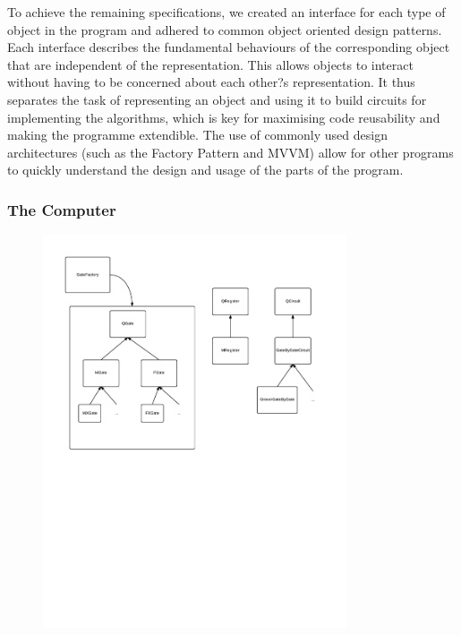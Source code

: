 \documentclass[bibliography=totocnumbered, 10pt]{article}
\theoremstyle{NoticeStyle}
\begin{document}
To achieve the remaining specifications, we created an interface for each type of object in the program and adhered to common object oriented design patterns. Each interface describes the fundamental behaviours of the corresponding object that are independent of the representation. This allows objects to interact without having to be concerned about each other?s representation. It thus separates the task of representing an object and using it to build circuits for implementing the algorithms, which is key for maximising code reusability and making the programme extendible. The use of commonly used design architectures (such as the Factory Pattern and MVVM) allow for other programs to quickly understand the design and usage of the parts of the program. 

\subsubsection{The Computer}\label{sec:The Computer}
\newenvironment{myenumerate}{%
  \edef\backupindent{\the\parindent}%
  \enumerate%
  \setlength{\parindent}{\backupindent}%
}{\endenumerate}

\begin{figure}[H]
\centering
\includegraphics[width=0.8\textwidth]{img/QuantumSimDesign.pdf}
\caption{}
\end{figure}
\end{document}
